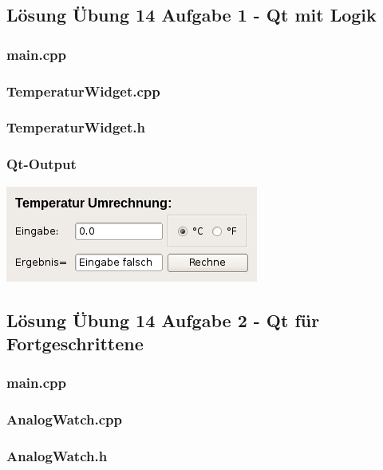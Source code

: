 \subsection{Lösung Übung 14 Aufgabe 1 - Qt mit Logik}
\subsubsection{main.cpp}

\subsubsection{TemperaturWidget.cpp}

\subsubsection{TemperaturWidget.h}

\subsubsection{Qt-Output}
\begin{center}
	\includegraphics[scale=.5]{./images/u14a1.png}
\end{center}

\newpage
\subsection{Lösung Übung 14 Aufgabe 2 - Qt für Fortgeschrittene}
\subsubsection{main.cpp}

\subsubsection{AnalogWatch.cpp}

\subsubsection{AnalogWatch.h}

